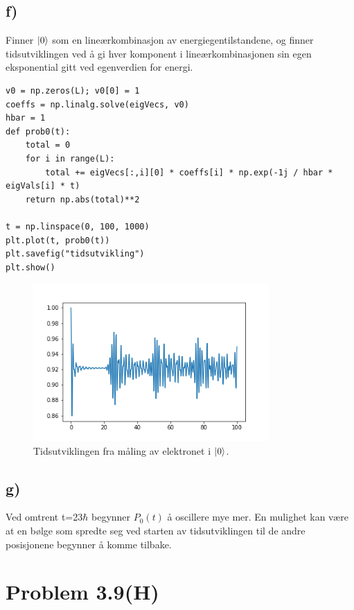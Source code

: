 \documentclass[norsk,a4paper,12pt]{article}
\begin{document}
	\subsection*{f)}
	Finner $\ket{0}$ som en lineærkombinasjon av energiegentilstandene, og finner tidsutviklingen ved å gi hver komponent i lineærkombinasjonen sin egen eksponential gitt ved egenverdien for energi.
	\begin{verbatim}
v0 = np.zeros(L); v0[0] = 1
coeffs = np.linalg.solve(eigVecs, v0)
hbar = 1
def prob0(t):
    total = 0
    for i in range(L):
        total += eigVecs[:,i][0] * coeffs[i] * np.exp(-1j / hbar * eigVals[i] * t)
    return np.abs(total)**2
    
t = np.linspace(0, 100, 1000)
plt.plot(t, prob0(t))
plt.savefig("tidsutvikling")
plt.show()
	\end{verbatim}
	\begin{figure}[H]
		\includegraphics[width=90mm]{../tidsutvikling.png}
		\caption{Tidsutviklingen fra måling av elektronet i $\ket{0}$.}
	\end{figure}

	\subsection*{g)}
	Ved omtrent t=23$\hbar$ begynner $P_0(t)$ å oscillere mye mer. En mulighet kan være at en bølge som spredte seg ved starten av tidsutviklingen til de andre posisjonene begynner å komme tilbake.
	
\section*{Problem 3.9(H)}
\end{document}
